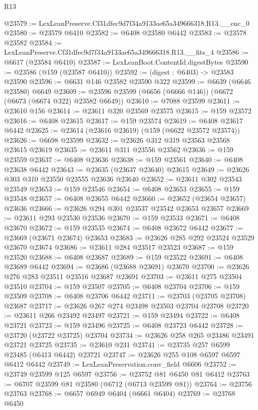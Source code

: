 \begin{lexlean}{R13}
\begin{coremodule}
@23579 := LexLeanPreserve.Cf31dfec9d7f34a9133ae65a349666318.R13.__enc_0
@23580 := @23579 @6410
@23582 := @6408 @23580 @6442
@23583 := @23578 @23582
@23584 := LexLeanPreserve.Cf31dfec9d7f34a9133ae65a349666318.R13.__fits_4
@23586 := @6617 (@23584 @6410)
@23587 := LexLeanBoot.ContentId.digestBytes
@23590 := @23586 (@159 (@23587 @6410))
@23592 := (digest : @6403) -> @23583 @23590
@23596 := @6631 @146 @23582 @23590 @322
@23599 := @6639 (@6646 @23580) @6649
@23609 := @23596 @23599 (@6656 (@6666 @146)) (@6672 (@6673 (@6674 @322) @23582 @6649))
@23610 := @7088 @23599
@23611 := @23610 @156
@23614 := @23611 @320 @23569 @23575
@23615 := @159 @23572
@23616 := @6408 @23615
@23617 := @159 @23574
@23619 := @6408 @23617 @6442
@23625 := @23614 (@23616 @23619) (@159 (@6622 @23572 @23574))
@23626 := @6698 @23599
@23632 := @23626 @312 @319 @23563 @23568 @23615 @23619
@23635 := @23611 @311 @23556 @23562
@23636 := @159 @23559
@23637 := @6408 @23636
@23638 := @159 @23561
@23640 := @6408 @23638 @6442
@23643 := @23635 (@23637 @23640) @23615
@23649 := @23626 @303 @310 @23550 @23555 @23636 @23640
@23652 := @23611 @302 @23543 @23549
@23653 := @159 @23546
@23654 := @6408 @23653
@23655 := @159 @23548
@23657 := @6408 @23655 @6442
@23660 := @23652 (@23654 @23657) @23636
@23666 := @23626 @294 @301 @23537 @23542 @23653 @23657
@23669 := @23611 @293 @23530 @23536
@23670 := @159 @23533
@23671 := @6408 @23670
@23672 := @159 @23535
@23674 := @6408 @23672 @6442
@23677 := @23669 (@23671 @23674) @23653
@23683 := @23626 @285 @292 @23524 @23529 @23670 @23674
@23686 := @23611 @284 @23517 @23523
@23687 := @159 @23520
@23688 := @6408 @23687
@23689 := @159 @23522
@23691 := @6408 @23689 @6442
@23694 := @23686 (@23688 @23691) @23670
@23700 := @23626 @276 @283 @23511 @23516 @23687 @23691
@23703 := @23611 @275 @23504 @23510
@23704 := @159 @23507
@23705 := @6408 @23704
@23706 := @159 @23509
@23708 := @6408 @23706 @6442
@23711 := @23703 (@23705 @23708) @23687
@23717 := @23626 @267 @274 @23498 @23503 @23704 @23708
@23720 := @23611 @266 @23492 @23497
@23721 := @159 @23494
@23722 := @6408 @23721
@23723 := @159 @23496
@23725 := @6408 @23723 @6442
@23728 := @23720 (@23722 @23725) @23704
@23734 := @23626 @258 @265 @23486 @23491 @23721 @23725
@23735 := @23610 @231
@23741 := @23735 @257 @6599 @23485 (@6413 @6442) @23721
@23747 := @23626 @255 @108 @6597 @6597 @6412 @6442
@23749 := LexLeanPreservation.conv_field @6606
@23752 := @23749 @23599 @125 @6597
@23756 := @23752 @81 @6450 @81 @6412
@23763 := @6707 @23599 @81 @23580 (@6712 (@6713 @23599 @81))
@23764 := @23756 @23763
@23768 := @6657 @6949 @6404 (@6661 @6404)
@23769 := @23768 @6450

\end{coremodule}
\end{lexlean}

